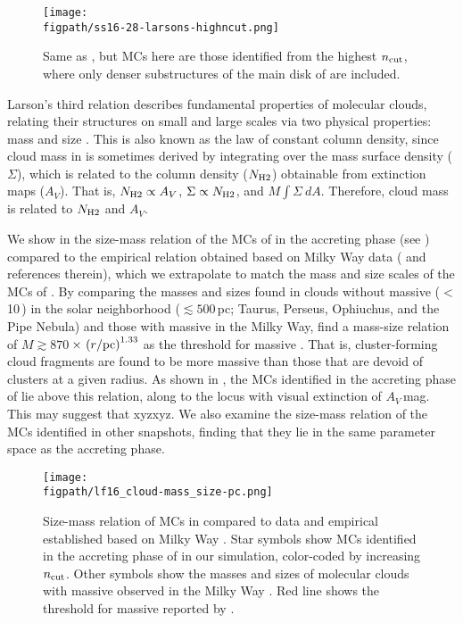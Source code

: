 \documentclass[iop]{emulateapj} %
\begin{document}
\begin{figure*}[htbp]
\centering
\texttt{[image: \\figpath/ss16-28-larsons-highncut.png]}
\caption{
Same as , but MCs here are those identified from the highest $n_{\rm cut}$,
where only denser substructures of the main disk of \flower are included.
\label{fig:larsons16-28-highncut}}
\end{figure*}

Larson's third relation describes fundamental properties of molecular clouds, relating their structures on small and large scales 
via two physical properties: mass and size \citep{Larson81a, Mckee07a}. This is also known as the law of constant column density, 
since cloud mass in \obs is sometimes derived by integrating
over the mass surface density ($\Sigma$), which is related to the column density ($N_{\rm H2}$) obtainable from extinction maps ($A_V$).   
That is, $N_{\rm H2}\propto A_V$, $\Sigma\propto N_{\rm H2}$, and $M$\eq$\int \Sigma~dA$.
Therefore, cloud mass is related to $N_{\rm H2}$ and $A_V$.

We show in  the size-mass relation of the MCs of \flower in the accreting phase (see )
compared to the empirical relation obtained based on 
Milky Way data (\citealt{Kauffmann10b, Kauffmann10c} and references therein),
which we extrapolate to match the mass and size scales of the MCs of \flower.
By comparing the masses and sizes found in clouds without massive \SF ($<$10\,\Msun) 
in the solar neighborhood ($\lesssim 500$\,pc; Taurus, Perseus, Ophiuchus, and the 
Pipe Nebula) and those with massive \SF in the Milky Way, \citet{Kauffmann10c} find a 
mass-size relation of $M \gtrsim 870$\,\Msun$\times\,\left(r/{\rm pc}\right)^{1.33}$ as the threshold for massive \SF. 
That is, cluster-forming cloud fragments are found to be more massive than those that are devoid of clusters 
at a given radius. As shown in , the MCs identified in the accreting phase of \flower lie above this relation, along to the locus 
with visual extinction of $A_V$\,mag. This may suggest that xyzxyz.
We also examine the size-mass relation of the MCs identified in other snapshots, finding that they lie in the same 
parameter space as the accreting phase.

\begin{figure*}[htbp]
\centering
\texttt{[image: \\figpath/lf16\_cloud-mass\_size-pc.png]}
\caption{
Size-mass relation of MCs in \flower compared to data and empirical established based on Milky Way \obs.
Star symbols show MCs identified in the accreting phase of \flower in our simulation, color-coded by increasing $n_{\rm cut}$.
Other symbols show the masses and sizes of molecular clouds with massive \SF observed in the 
Milky Way \citep{Beuther02a, Mueller02a, Hill05a, Motte07a}.
Red line shows the threshold for massive \SF reported by \citet{Kauffmann10b}.
\label{fig:MR}}
\end{figure*}
\end{document}
